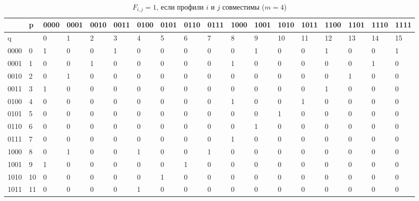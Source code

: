 \begin{enumerate}
\begin {table}[ht]
\caption 
{ $F_{i,j}=1$, если профили $i$ и $j$ совместимы  ($m=4$)}
\label {tab02}
\begin{center}
\begin{tabular}{|p{0.19in}|p{0.15in}|p{0.19in}|p{0.19in}|p{0.19in}|p{0.19in}|p{0.19in}|p{0.19in}|p{0.19in}|p{0.19in}|p{0.19in}|p{0.19in}|p{0.19in}|p{0.19in}|p{0.19in}|p{0.19in}|p{0.19in}|p{0.19in}| }
\hline
\centering
  & p & \scriptsize{0000} & \scriptsize{0001} & \scriptsize{0010} & \scriptsize{0011} & \scriptsize{0100} & \scriptsize{0101} & \scriptsize{0110} & \scriptsize{0111} & \scriptsize{1000} & \scriptsize{1001} & \scriptsize{1010} & \scriptsize{1011} & \scriptsize{1100} & \scriptsize{1101} & \scriptsize{1110} & \scriptsize{1111} \\
\hline
q &  & 0 & 1 & 2 & 3 & 4 & 5 & 6 & 7 & 8 & 9 & 10 & 11 & 12 & 13 & 14 & 15 \\
\hline
\scriptsize{0000} & 0 & 1 & 0 & 0 & 1 & 0 & 0 & 0 & 0 & 0 & 1 & 0 & 0 & 1 & 0 & 0 & 1 \\
\hline
\scriptsize{0001} & 1 & 0 & 0 & 1 & 0 & 0 & 0 & 0 & 0 & 1 & 0 & 0 & 0 & 0 & 0 & 1 & 0 \\
\hline
\scriptsize{0010} & 2 & 0 & 1 & 0 & 0 & 0 & 0 & 0 & 0 & 0 & 0 & 0 & 0 & 0 & 1 & 0 & 0 \\
\hline
\scriptsize{0011} & 3 & 1 & 0 & 0 & 0 & 0 & 0 & 0 & 0 & 0 & 0 & 0 & 0 & 1 & 0 & 0 & 0 \\
\hline
\scriptsize{0100} & 4 & 0 & 0 & 0 & 0 & 0 & 0 & 0 & 0 & 1 & 0 & 0 & 1 & 0 & 0 & 0 & 0 \\
\hline
\scriptsize{0101} & 5 & 0 & 0 & 0 & 0 & 0 & 0 & 0 & 0 & 0 & 0 & 1 & 0 & 0 & 0 & 0 & 0 \\
\hline
\scriptsize{0110} & 6 & 0 & 0 & 0 & 0 & 0 & 0 & 0 & 0 & 0 & 1 & 0 & 0 & 0 & 0 & 0 & 0 \\
\hline
\scriptsize{0111} & 7 & 0 & 0 & 0 & 0 & 0 & 0 & 0 & 0 & 1 & 0 & 0 & 0 & 0 & 0 & 0 & 0 \\
\hline
\scriptsize{1000} & 8 & 0 & 1 & 0 & 0 & 1 & 0 & 0 & 1 & 0 & 0 & 0 & 0 & 0 & 0 & 0 & 0 \\
\hline
\scriptsize{1001} & 9 & 1 & 0 & 0 & 0 & 0 & 0 & 1 & 0 & 0 & 0 & 0 & 0 & 0 & 0 & 0 & 0 \\
\hline
\scriptsize{1010} & 10 & 0 & 0 & 0 & 0 & 0 & 1 & 0 & 0 & 0 & 0 & 0 & 0 & 0 & 0 & 0 & 0 \\
\hline
\scriptsize{1011} & 11 & 0 & 0 & 0 & 0 & 1 & 0 & 0 & 0 & 0 & 0 & 0 & 0 & 0 & 0 & 0 & 0 \\

\end{tabular}
\end{center}
\end{table}
\end{enumerate}
